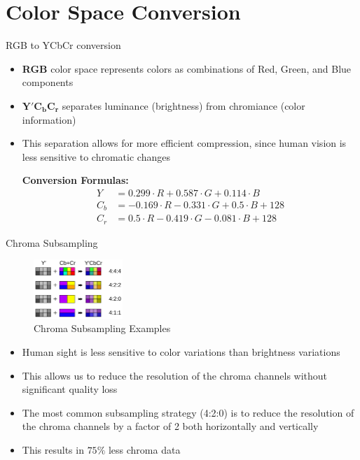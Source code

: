 \documentclass[10pt]{beamer}
\begin{document}
\section{Color Space Conversion}

\begin{frame}{RGB to YCbCr conversion}
    \begin{itemize}
     \item \textbf{RGB} color space represents colors as combinations of Red, Green, and Blue components
     \item $\bm{Y'C_bC_r}$ separates luminance (brightness) from chromiance (color information)
     \item This separation allows for more efficient compression, since human vision is less sensitive to chromatic changes

     \vspace{0.5cm}
     \textbf{Conversion Formulas:}
     \begin{align}
      Y &= 0.299\cdot R + 0.587\cdot G + 0.114\cdot B\\
      C_b &= -0.169\cdot R - 0.331\cdot G + 0.5\cdot B + 128\\
      C_r &= 0.5\cdot R - 0.419\cdot G - 0.081\cdot B + 128
     \end{align}
    \end{itemize}
\end{frame}

\begin{frame}{Chroma Subsampling}

    \begin{figure}[h]
        \centering
        \includegraphics[width=0.3\textwidth]{chroma.png}
        \caption{Chroma Subsampling Examples}
    \end{figure}

    \begin{itemize}
     \item Human sight is less sensitive to color variations than brightness variations
     \item This allows us to reduce the resolution of the chroma channels without significant quality loss
     \item The most common subsampling strategy (4:2:0) is to reduce the resolution of the chroma channels by a factor of 2 both horizontally and vertically
     \item This results in $75\%$ less chroma data
    \end{itemize}

\end{frame}
\end{document}
